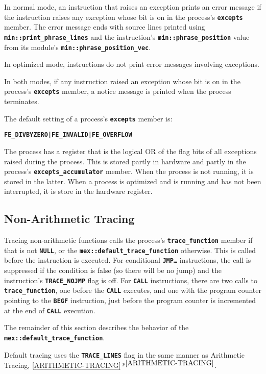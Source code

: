 \documentclass[12pt]{article}
\newcommand{\TT}[1]{{\tt \bfseries #1}}
\newcommand{\itemref}[1]{\ref{#1}$\,^{p\pageref{#1}}$}
\newcommand{\EOL}{\penalty \exhyphenpenalty}
\begin{document}
In normal mode, an instruction that raises an exception prints
an error message if the instruction raises any exception whose bit
is on in the process's \TT{excepts} member.
The error message ends with source lines printed
using \TT{min::\EOL print\_\EOL phrase\_\EOL lines} and the
instruction's \TT{min::phrase\_\EOL position} value from its module's
\TT{min::phrase\_\EOL position\_\EOL vec}.

In optimized mode, instructions do not print error messages
involving exceptions.

In both modes, if any instruction raised an exception whose bit
is on in the process's \TT{excepts} member, a notice message is
printed when the process terminates.

The default setting of a process's \TT{excepts} member
is:
\begin{center}
\TT{FE\_DIVBYZERO|FE\_INVALID|FE\_OVERFLOW}
\end{center}

The process has a register that is the logical OR of the flag bits
of all exceptions
raised during the process.  This is stored partly in hardware
and partly in the process's \TT{excepts\_\EOL accumulator} member.
When the process is not running, it is stored in the latter.  When
a process is optimized and is running and has not been interrupted,
it is store in the hardware register.

\subsection{Non-Arithmetic Tracing}
\label{NON-ARITHMETIC-TRACING}

Tracing non-arithmetic functions calls the process's
\TT{trace\_function} member if that is not \TT{NULL},
or the \TT{mex::\EOL default\_\EOL trace\_\EOL function}
otherwise.  This is called before the instruction is
executed.  For conditional \TT{JMP\ldots} instructions,
the call is suppressed if the condition is false (so there
will be no jump) and the instruction's \TT{TRACE\_NOJMP}
flag is off.  For \TT{CALL} instructions, there are two
calls to \TT{trace\_function}, one before the \TT{CALL}
executes, and one with the program counter pointing
to the \TT{BEGF} instruction, just before the program
counter is incremented at the end of \TT{CALL} execution.

The remainder of this section describes the behavior of
the \TT{mex::\EOL default\_\EOL trace\_\EOL function}.

Default tracing uses the \TT{TRACE\_LINES} flag in the
same manner as Arithmetic Tracing, \itemref{ARITHMETIC-TRACING}.
\end{document}
